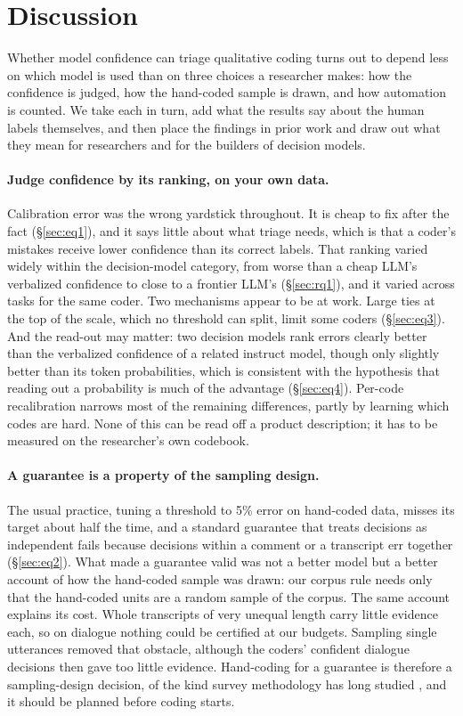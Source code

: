 \FloatBarrier
\section{Discussion}
\label{sec:discussion}

Whether model confidence can triage qualitative coding turns out to depend less on which model is used than on three choices
a researcher makes: how the confidence is judged, how the hand-coded sample is drawn, and how automation is counted. We take
each in turn, add what the results say about the human labels themselves, and then place the findings in prior work and
draw out what they mean for researchers and for the builders of decision models.

\paragraph{Judge confidence by its ranking, on your own data.} Calibration error was the wrong yardstick throughout. It is
cheap to fix after the fact (\S\ref{sec:eq1}), and it says little about what triage needs, which is that a coder's mistakes
receive lower confidence than its correct labels. That ranking varied widely within the decision-model category, from worse
than a cheap LLM's verbalized confidence to close to a frontier LLM's (\S\ref{sec:rq1}), and it varied across tasks for the
same coder. Two mechanisms appear to be at work. Large ties at the top of the scale, which no threshold can split, limit
some coders (\S\ref{sec:eq3}). And the read-out may matter: two decision models rank errors clearly better than the
verbalized confidence of a related instruct model, though only slightly better than its token probabilities, which is
consistent with the hypothesis that reading out a probability is much of the advantage (\S\ref{sec:eq4}). Per-code recalibration narrows
most of the remaining differences, partly by learning which codes are hard. None of this can be read off a product
description; it has to be measured on the researcher's own codebook.

\paragraph{A guarantee is a property of the sampling design.} The usual practice, tuning a threshold to 5\% error on
hand-coded data, misses its target about half the time, and a standard guarantee that treats decisions as independent fails
because decisions within a comment or a transcript err together (\S\ref{sec:eq2}). What made a guarantee valid was not a
better model but a better account of how the hand-coded sample was drawn: our corpus rule needs only that the hand-coded
units are a random sample of the corpus. The same account explains its cost. Whole transcripts of very unequal length carry
little evidence each, so on dialogue nothing could be certified at our budgets. Sampling single utterances removed that
obstacle, although the coders' confident dialogue decisions then gave too little evidence. Hand-coding for a guarantee is therefore a sampling-design decision, of the kind survey methodology has long
studied \citep{horvitz1952generalization}, and it should be planned before coding starts.

